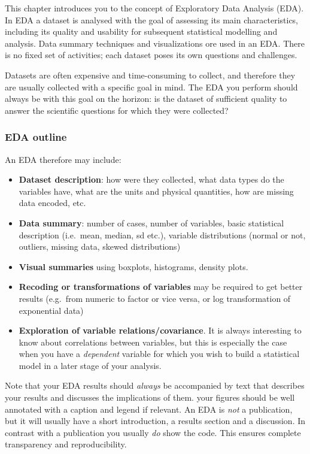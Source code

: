 \documentclass[]{book}
\providecommand{\tightlist}{%
  \setlength{\itemsep}{0pt}\setlength{\parskip}{0pt}}
\begin{document}
This chapter introduces you to the concept of Exploratory Data Analysis (EDA). In EDA a dataset is analysed with the goal of assessing its main characteristics, including its quality and usability for subsequent statistical modelling and analysis. Data summary techniques and visualizations ore used in an EDA. There is no fixed set of activities; each dataset poses its own questions and challenges.

Datasets are often expensive and time-consuming to collect, and therefore they are usually collected with a specific goal in mind. The EDA you perform should always be with this goal on the horizon: is the dataset of sufficient quality to answer the scientific questions for which they were collected?

\hypertarget{eda-outline}{%
\subsubsection*{EDA outline}\label{eda-outline}}

An EDA therefore may include:

\begin{itemize}
\tightlist
\item
  \textbf{Dataset description}: how were they collected, what data types do the variables have, what are the units and physical quantities, how are missing data encoded, etc.
\item
  \textbf{Data summary}: number of cases, number of variables, basic statistical description (i.e.~mean, median, sd etc.), variable distributions (normal or not, outliers, missing data, skewed distributions)
\item
  \textbf{Visual summaries} using boxplots, histograms, density plots.
\item
  \textbf{Recoding or transformations of variables} may be required to get better results (e.g.~from numeric to factor or vice versa, or log transformation of exponential data)
\item
  \textbf{Exploration of variable relations/covariance}. It is always interesting to know about correlations between variables, but this is especially the case when you have a \emph{dependent} variable for which you wish to build a statistical model in a later stage of your analysis.
\end{itemize}

Note that your EDA results should \emph{always} be accompanied by text that describes your results and discusses the implications of them. your figures should be well annotated with a caption and legend if relevant. An EDA is \emph{not} a publication, but it will usually have a short introduction, a results section and a discussion. In contrast with a publication you usually \emph{do} show the code. This ensures complete transparency and reproducibility.
\end{document}
